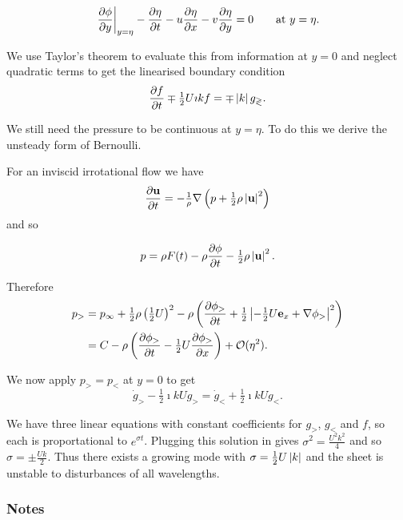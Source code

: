 \documentclass{notes}
\newcommand{\cO}{\mathcal{O}}
\newcommand{\e}{\mathbf{e}}
\theoremstyle{plain}
\begin{document}
\[
\left.\frac{\partial \phi}{\partial y}\right|_{y = \eta} - \frac{\partial \eta}{\partial t}
-u \frac{\partial \eta}{\partial x} - v \frac{\partial \eta}{\partial y} = 0 \qquad \text{at } y = \eta.
\]

We use Taylor's theorem to evaluate this from information at $y=0$
and neglect quadratic terms to get the linearised boundary condition
\[
\frac{\partial f}{\partial t} \mp \tfrac{1}{2} U \imath k f = \mp \left|k\right| g_\gtrless.
\]

We still need the pressure to be continuous at $y = \eta$.  To do this
we derive the unsteady form of Bernoulli.

For an inviscid irrotational flow we have
\[
\frac{\partial \mathbf{u}}{\partial t} = -\tfrac{1}{\rho} \nabla \left( p + \tfrac{1}{2} \rho
\left|\mathbf{u}\right|^2\right)
\]
and so

\begin{equation}\label{eq:unstbern}
p = \rho F(t) - \rho \frac{\partial \phi}{\partial t} - \tfrac{1}{2} \rho \left|\mathbf{u}\right|^2.
\end{equation}

Therefore
\begin{align*}
p_> &= p_\infty + \tfrac{1}{2} \rho \left( \tfrac{1}{2} U \right)^2
- \rho \left( \pd{\phi_>}{t} + \tfrac{1}{2} \abs{-\tfrac{1}{2} U
\e_x + \nabla \phi_>}^2\right) \\
&= C - \rho \left( \pd{\phi_>}{t} - \tfrac{1}{2} U \pd{\phi_>}{x}
\right) + \cO(\eta^2).
\end{align*}

We now apply $p_> = p_<$ at $y = 0$ to get
\[
\dot{g}_> - \tfrac{1}{2} \imath k U g_>
= \dot{g}_< + \tfrac{1}{2} \imath k U g_<.
\]

We have three linear equations with constant coefficients for
$g_>$, $g_<$ and $f$, so each is proportational to $e^{\sigma t}$.  Plugging
this solution in gives $\sigma^2 = \frac{U^2 k^2}{4}$ and so
$\sigma = \pm \frac{U k}{2}$.  Thus there exists a growing mode
with $\sigma = \tfrac{1}{2} U \left|k\right|$ and the sheet is unstable to
disturbances of all wavelengths.

\subsubsection*{Notes}
\end{document}
